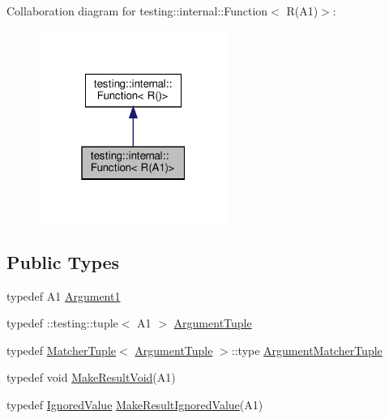 Collaboration diagram for testing\+:\+:internal\+:\+:Function$<$ R(A1)$>$\+:
\nopagebreak
\begin{figure}[H]
\begin{center}
\leavevmode
\includegraphics[width=175pt]{structtesting_1_1internal_1_1_function_3_01_r_07_a1_08_4__coll__graph}
\end{center}
\end{figure}
\subsection*{Public Types}
\begin{DoxyCompactItemize}
\item 
typedef A1 \hyperlink{structtesting_1_1internal_1_1_function_3_01_r_07_a1_08_4_aca36c8586218fd015cc4736dc8d4c14f}{Argument1}
\item 
typedef \+::testing\+::tuple$<$ A1 $>$ \hyperlink{structtesting_1_1internal_1_1_function_3_01_r_07_a1_08_4_afd48881a58d72658e547a170fb0f2087}{Argument\+Tuple}
\item 
typedef \hyperlink{structtesting_1_1internal_1_1_matcher_tuple}{Matcher\+Tuple}$<$ \hyperlink{structtesting_1_1internal_1_1_function_3_01_r_07_08_4_ad483c3128c470d8cdb55c3ac1c575c11}{Argument\+Tuple} $>$\+::type \hyperlink{structtesting_1_1internal_1_1_function_3_01_r_07_a1_08_4_a0e35671ae43c3d3310893e1d6d895d06}{Argument\+Matcher\+Tuple}
\item 
typedef void \hyperlink{structtesting_1_1internal_1_1_function_3_01_r_07_a1_08_4_aab10495172953eb51fc3940c4c1e890a}{Make\+Result\+Void}(A1)
\item 
typedef \hyperlink{classtesting_1_1internal_1_1_ignored_value}{Ignored\+Value} \hyperlink{structtesting_1_1internal_1_1_function_3_01_r_07_a1_08_4_a8fa56b9e05cb029ec7c8415ee352f865}{Make\+Result\+Ignored\+Value}(A1)
\end{DoxyCompactItemize}



